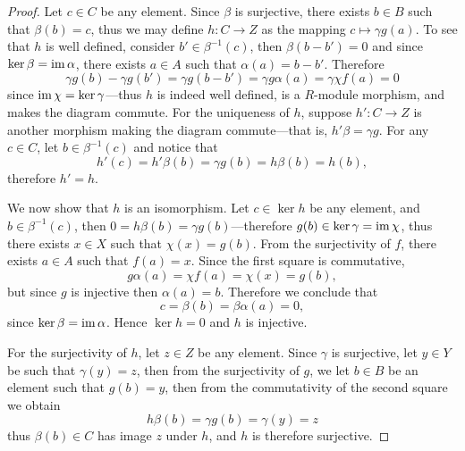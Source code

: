 \begin{proof}
    Let \(c \in C\) be any element. Since \(\beta\) is surjective, there exists
    \(b \in B\) such that \(\beta(b) = c\), thus we may define \(h: C \to Z\) as the
    mapping \(c \mapsto \gamma g(a)\). To see that \(h\) is well defined, consider
    \(b' \in \beta^{-1}(c)\), then \(\beta(b - b') = 0\) and since \(\ker \beta =
    \operatorname{im} \alpha\), there exists \(a \in A\) such that \(\alpha(a) = b -
    b'\). Therefore
    \[
        \gamma g(b) - \gamma g(b') = \gamma g(b - b')
        = \gamma g \alpha(a) = \gamma \chi f(a)
        = 0
    \]
    since \(\operatorname{im} \chi = \ker \gamma\)---thus \(h\) is indeed well defined, is a
    \(R\)-module morphism, and makes the diagram commute. For the uniqueness of
    \(h\), suppose \(h': C \to Z\) is another morphism making the diagram
    commute---that is, \(h' \beta = \gamma g\). For any \(c \in C\), let
    \(b \in \beta^{-1}(c)\) and notice that
    \[
        h'(c) = h'\beta(b) = \gamma g(b) = h \beta(b) = h(b),
    \]
    therefore \(h' = h\).

    We now show that \(h\) is an isomorphism. Let \(c \in \ker h\) be any element,
    and \(b \in \beta^{-1}(c)\), then \(0 = h \beta(b) = \gamma g(b)\)---therefore
    \(g(b) \in \ker \gamma = \operatorname{im} \chi\), thus there exists \(x \in X\) such that
    \(\chi(x) = g(b)\). From the surjectivity of \(f\), there exists \(a \in A\)
    such that \(f(a) = x\). Since the first square is commutative,
    \[
        g \alpha(a) = \chi f(a) = \chi(x) = g(b),
    \]
    but since \(g\) is injective then \(\alpha(a) = b\). Therefore we conclude that
    \[
        c = \beta(b) = \beta \alpha(a) = 0,
    \]
    since \(\ker \beta = \operatorname{im} \alpha\). Hence \(\ker h = 0\) and \(h\) is injective.

    For the surjectivity of \(h\), let \(z \in Z\) be any element. Since \(\gamma\)
    is surjective, let \(y \in Y\) be such that \(\gamma(y) = z\), then from the
    surjectivity of \(g\), we let \(b \in B\) be an element such that \(g(b) = y\),
    then from the commutativity of the second square we obtain
    \[
        h \beta(b) = \gamma g(b) = \gamma(y) = z
    \]
    thus \(\beta(b) \in C\) has image \(z\) under \(h\), and \(h\) is therefore
    surjective.
\end{proof}

